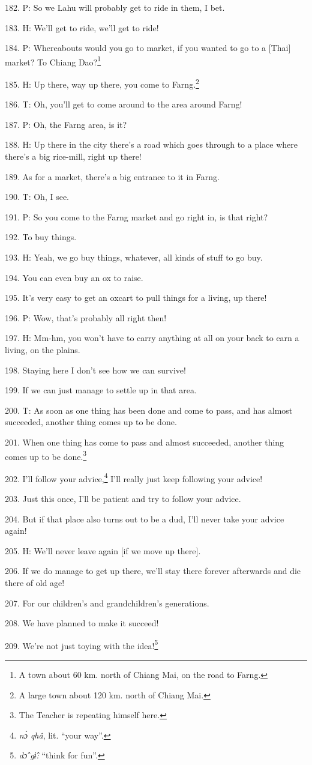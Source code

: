 182. P: So we Lahu will probably get to ride in them, I bet.

183. H: We'll get to ride, we'll get to ride!

184. P: Whereabouts would you go to market, if you wanted to go to a [Thai] market?
To Chiang Dao?\footnote{A town about 60 km. north of Chiang Mai, on the road to Farng.}

185. H: Up there, way up there, you come to Farng.\footnote{A large town about 120 km. north of Chiang Mai.}

186. T: Oh, you'll get to come around to the area around Farng!

187. P: Oh, the Farng area, is it?

188. H: Up there in the city there's a road which goes through to a place where
there's a big rice-mill, right up there!

189. As for a market, there's a big entrance to it in Farng.

190. T: Oh, I see.

191. P: So you come to the Farng market and go right in, is that right?

192. To buy things.

193. H: Yeah, we go buy things, whatever, all kinds of stuff to go buy.

194. You can even buy an ox to raise.

195. It's very easy to get an oxcart to pull things for a living, up there!

196. P: Wow, that's probably all right then!

197. H: Mm-hm, you won't have to carry anything at all on your back to earn a living,
on the plains.

198. Staying here I don't see how we can survive!

199. If we can just manage to settle up in that area.

200. T: As soon as one thing has been done and come to pass, and has almost succeeded,
another thing comes up to be done.

201. When one thing has come to pass and almost succeeded, another thing comes
up to be done.\footnote{The Teacher is repeating himself here.}

202. I'll follow your advice,\footnote{\textit{nɔ̀ qhâ}, lit. ``your way''.} I'll really just keep following your advice!

203. Just this once, I'll be patient and try to follow your advice.

204. But if that place also turns out to be a dud, I'll never take your advice
again!

205. H: We'll never leave again [if we move up there].

206. If we do manage to get up there, we'll stay there forever afterwards and die
there of old age!

207. For our children's and grandchildren's generations.

208. We have planned to make it succeed!

209. We're not just toying with the idea!\footnote{\textit{dɔ̂ gɨ̂:} ``think for fun''.}

